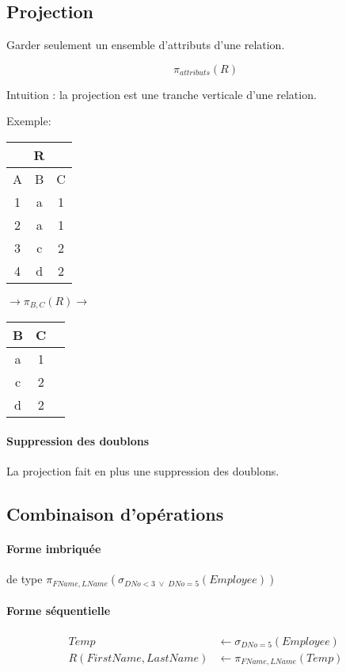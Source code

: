 \documentclass[a4paper]{article}
\begin{document}
  \subsection{Projection}
  Garder seulement un ensemble d'attributs d'une relation.

  $$ \pi_{attributs}(R) $$

  Intuition : la projection est une tranche verticale d'une relation.

    Exemple:
  \begin{tabular}{|c|c|c|}
	\multicolumn{3}{c}{R}\\
	\hline
	A & B & C\\
	\hline\hline
	1 & a & 1\\
	2 & a & 1\\
	3 & c & 2\\
	4 & d & 2\\
	\hline
  \end{tabular}
  $\rightarrow \pi_{B,C}(R) \rightarrow$
  \begin{tabular}{|c|c|c|}
	\hline
	B & C\\
	\hline\hline
	a & 1\\
	c & 2\\
	d & 2\\
	\hline
  \end{tabular}
  
  \paragraph{Suppression des doublons}
  La projection fait en plus une suppression des doublons.

  \subsection{Combinaison d'opérations}

  \paragraph{Forme imbriquée} de type $ \pi_{FName, LName}(\sigma_{DNo<3\; \lor\; DNo=5 }(Employee))$

  \paragraph{Forme séquentielle}
  \begin{align*}
    Temp &\leftarrow \sigma_{DNo=5}(Employee)\\
    R(FirstName, LastName) &\leftarrow \pi_{FName, LName}(Temp)
  \end{align*}
\end{document}
